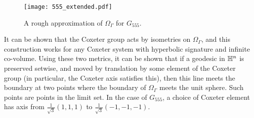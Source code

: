 \begin{figure}
	\centering
	\texttt{[image: 555\_extended.pdf]}
	\caption{A rough approximation of $\Omega_\Gamma$ for $G_{555}$.}
	\label{fig:555_exteded_space}
\end{figure}


It can be shown that the Coxeter group acts by isometries on $\Omega_\Gamma$, and this construction works for any Coxeter system with hyperbolic signature and infinite co-volume.
Using these two metrics, it can be shown that if a geodesic in $\mathbb{H}^n$ is preserved setwise, and moved by translation by some element of the Coxeter group (in particular, the Coxeter axis satisfies this), then this line meets the boundary at two points where the boundary of $\Omega_\Gamma$ meets the unit sphere.
Such points are points in the limit set.
In the case of $G_{555}$, a choice of Coxeter element has axis from  $\frac{1}{\sqrt{3}}(1,1,1)$ to $\frac{1}{\sqrt{3}}(-1,-1,-1)$.


